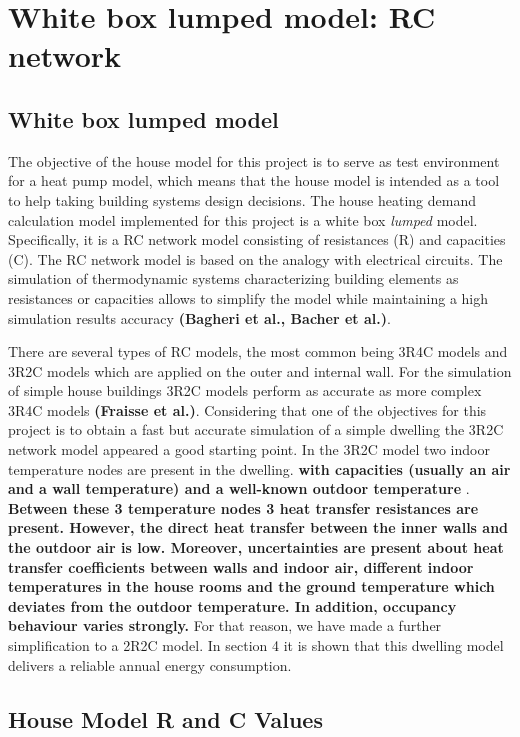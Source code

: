 \section{White box lumped model: RC network}
\subsection{White box lumped model}

The objective of the house model for this project is to serve as test environment for a heat pump model, which means that the house model is intended as a tool to help taking building systems design decisions. The house heating demand calculation model implemented for this project is a white box \emph{lumped} model. Specifically, it is a RC network model consisting of resistances (R) and capacities (C). The RC network model is based on the analogy with electrical circuits. The simulation of thermodynamic systems characterizing building elements as resistances or capacities allows to simplify the model while maintaining a high simulation results accuracy \textbf{(Bagheri et al.\cite{en11040890}, Bacher et al\cite{Bacher}.)}.  

There are several types of RC models, the most common being 3R4C models and 3R2C models which are applied on the outer and internal wall. For the simulation of simple house buildings 3R2C models perform as accurate as more complex 3R4C models \textbf{(Fraisse et al.\cite{Fraisse})}. Considering that one of the objectives for this project is to obtain a fast but accurate simulation of a simple dwelling the 3R2C network model appeared a good starting point. In the 3R2C model two indoor temperature nodes are present in the dwelling. \textbf{with capacities (usually an air and a wall temperature) and a well-known outdoor temperature }. \textbf{Between these 3 temperature nodes 3 heat transfer resistances are present. However, the direct heat transfer between the inner walls and the outdoor air is low. Moreover, uncertainties are present about heat transfer coefficients between walls and indoor air, different indoor temperatures in the house rooms and the ground temperature which deviates from the outdoor temperature. In addition, occupancy behaviour varies strongly. }For that reason, we have made a further simplification to a 2R2C model. In section 4 it is shown that this dwelling model delivers a reliable annual energy consumption.


\subsection{House Model R and C Values}

